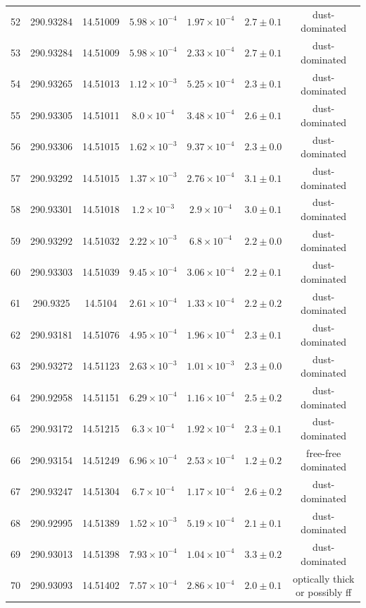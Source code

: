 \begin{table}
\begin{tabular}{ccccccc}
52 & 290.93284 & 14.51009 & $5.98\times10^{-4}$ & $1.97\times10^{-4}$ & $2.7\pm0.1$ & dust-dominated \\
53 & 290.93284 & 14.51009 & $5.98\times10^{-4}$ & $2.33\times10^{-4}$ & $2.7\pm0.1$ & dust-dominated \\
54 & 290.93265 & 14.51013 & $1.12\times10^{-3}$ & $5.25\times10^{-4}$ & $2.3\pm0.1$ & dust-dominated \\
55 & 290.93305 & 14.51011 & $8.0\times10^{-4}$ & $3.48\times10^{-4}$ & $2.6\pm0.1$ & dust-dominated \\
56 & 290.93306 & 14.51015 & $1.62\times10^{-3}$ & $9.37\times10^{-4}$ & $2.3\pm0.0$ & dust-dominated \\
57 & 290.93292 & 14.51015 & $1.37\times10^{-3}$ & $2.76\times10^{-4}$ & $3.1\pm0.1$ & dust-dominated \\
58 & 290.93301 & 14.51018 & $1.2\times10^{-3}$ & $2.9\times10^{-4}$ & $3.0\pm0.1$ & dust-dominated \\
59 & 290.93292 & 14.51032 & $2.22\times10^{-3}$ & $6.8\times10^{-4}$ & $2.2\pm0.0$ & dust-dominated \\
60 & 290.93303 & 14.51039 & $9.45\times10^{-4}$ & $3.06\times10^{-4}$ & $2.2\pm0.1$ & dust-dominated \\
61 & 290.9325 & 14.5104 & $2.61\times10^{-4}$ & $1.33\times10^{-4}$ & $2.2\pm0.2$ & dust-dominated \\
62 & 290.93181 & 14.51076 & $4.95\times10^{-4}$ & $1.96\times10^{-4}$ & $2.3\pm0.1$ & dust-dominated \\
63 & 290.93272 & 14.51123 & $2.63\times10^{-3}$ & $1.01\times10^{-3}$ & $2.3\pm0.0$ & dust-dominated \\
64 & 290.92958 & 14.51151 & $6.29\times10^{-4}$ & $1.16\times10^{-4}$ & $2.5\pm0.2$ & dust-dominated \\
65 & 290.93172 & 14.51215 & $6.3\times10^{-4}$ & $1.92\times10^{-4}$ & $2.3\pm0.1$ & dust-dominated \\
66 & 290.93154 & 14.51249 & $6.96\times10^{-4}$ & $2.53\times10^{-4}$ & $1.2\pm0.2$ & free-free dominated \\
67 & 290.93247 & 14.51304 & $6.7\times10^{-4}$ & $1.17\times10^{-4}$ & $2.6\pm0.2$ & dust-dominated \\
68 & 290.92995 & 14.51389 & $1.52\times10^{-3}$ & $5.19\times10^{-4}$ & $2.1\pm0.1$ & dust-dominated \\
69 & 290.93013 & 14.51398 & $7.93\times10^{-4}$ & $1.04\times10^{-4}$ & $3.3\pm0.2$ & dust-dominated \\
70 & 290.93093 & 14.51402 & $7.57\times10^{-4}$ & $2.86\times10^{-4}$ & $2.0\pm0.1$ & optically thick or possibly ff \\

\end{tabular}
\end{table}
